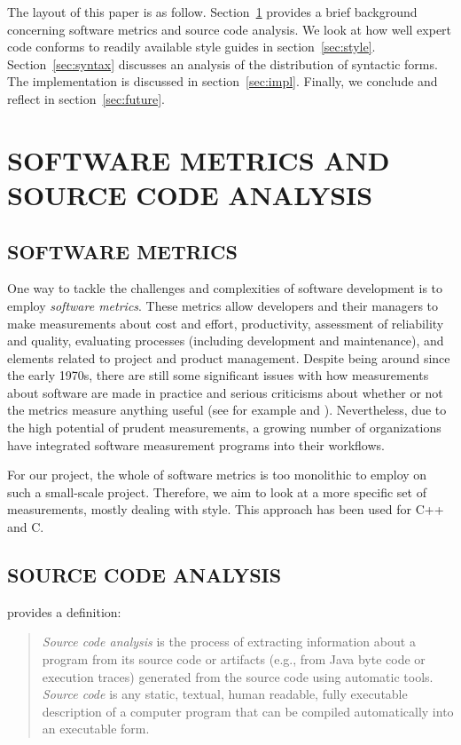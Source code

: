 \documentclass[12pt,abstracton]{scrartcl}
\begin{document}
The layout of this paper is as follow.
Section~\ref{sec:metric} provides a brief background
concerning software metrics and source code analysis.
We look at how well expert code conforms to readily available
style guides in section~\ref{sec:style}.
Section~\ref{sec:syntax} discusses an analysis
of the distribution of syntactic forms.
The implementation is discussed
in section~\ref{sec:impl}. Finally, we conclude and reflect in section~\ref{sec:future}.
\section{SOFTWARE METRICS AND SOURCE CODE ANALYSIS}\label{sec:metric}
\subsection{SOFTWARE METRICS}
One way to tackle the challenges and complexities of software development is to employ
\emph{software metrics}. These metrics allow developers and their managers to make
measurements about cost and effort, productivity, assessment of reliability and
quality, evaluating processes (including development and maintenance), and elements
related to project and product management.\cite{Ord08} Despite being around since
the early 1970s, there are still some significant issues with how measurements
about software are made in practice and serious criticisms about whether or not the metrics
measure anything useful (see for example \cite{Jon94} and \cite{Bou12}).
Nevertheless, due to the high potential of prudent measurements,
a growing number of organizations have integrated software measurement programs into
their workflows.\cite{Ord08}

For our project, the whole of software metrics is too monolithic to employ on
such a small-scale project. Therefore, we aim to look at a more specific set of measurements,
mostly dealing with style. This approach has been used for C++\cite{Aye98} and C\cite{Tak11}.
\subsection{SOURCE CODE ANALYSIS}
\cite{Bin07} provides a definition:
\begin{quote}
\emph{Source code analysis} is the process of extracting
information about a program from its source code
or artifacts (e.g., from Java byte code or execution
traces) generated from the source code using automatic tools.
\emph{Source code} is any static, textual,
human readable, fully executable description of
a computer program that can be compiled automatically into an executable form.
\end{quote}
\end{document}
